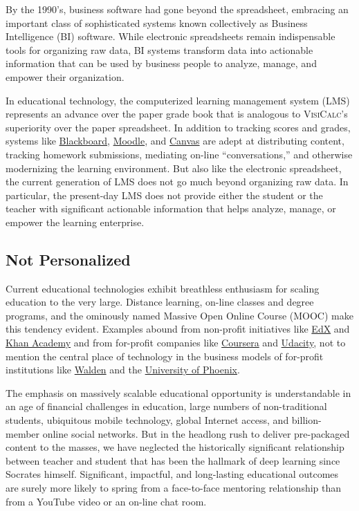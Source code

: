 \documentclass{article}
\newcommand{\vcalc}{\textsc{VisiCalc}}
\begin{document}
By the 1990's, business software had gone beyond the spreadsheet,
embracing an important class of sophisticated systems
known collectively as Business Intelligence (BI) software.
While electronic spreadsheets
remain indispensable tools for organizing raw data,
BI systems transform data into actionable information
that can be used by business people
to analyze, manage, and empower their organization.

In educational technology,
the computerized learning management system (LMS)
represents an advance over the paper grade book
that is analogous to \vcalc{}'s superiority over the paper spreadsheet.
In addition to tracking scores and grades,
systems like
\href{https://www.blackboard.com/}{Blackboard},
\href{https://moodle.org/}{Moodle},
and
\href{https://www.instructure.com/canvas/}{Canvas}
are adept at distributing content,
tracking homework submissions,
mediating on-line ``conversations,''
and otherwise modernizing the learning environment.
But also like the electronic spreadsheet,
the current generation of LMS
does not go much beyond organizing raw data.
In particular,
the present-day LMS
does not provide either the student or the teacher
with significant actionable information
that helps analyze, manage, or empower the learning enterprise.

\subsection{Not Personalized}
\label{sec:not-personalized}

Current educational technologies
exhibit breathless enthusiasm
for scaling education to the very large.
Distance learning, on-line classes and degree programs,
and the ominously named Massive Open Online Course (MOOC)
make this tendency evident.
Examples abound from non-profit initiatives like
\href{https://www.edx.org/}{EdX} and
\href{https://www.khanacademy.org/}{Khan Academy}
and from for-profit companies like
\href{https://www.coursera.org/}{Coursera}
and
\href{https://www.udacity.com/}{Udacity},
not to mention the central place of technology
in the business models of for-profit institutions
like
\href{https://waldenu.edu/}{Walden} and the
\href{https://www.phoenix.edu/}{University of Phoenix}.

The emphasis on massively scalable educational opportunity
is understandable in an age of financial challenges in education,
large numbers of non-tradi\-tional students,
ubiquitous mobile technology,
global Internet access,
and billion-member online social networks.
But in the headlong rush
to deliver pre-packaged content to the masses,
we have neglected the historically significant relationship
between teacher and student
that has been the hallmark of deep learning since Socrates himself.
Significant, impactful, and long-lasting educational outcomes
are surely more likely to spring
from a face-to-face mentoring relationship
than from a YouTube video or an on-line chat room.
\end{document}
